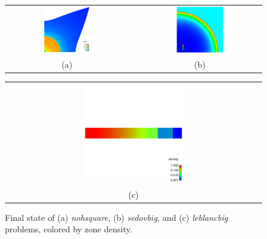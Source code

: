 \documentclass[11pt,letterpaper]{article}
\begin{document}
\begin{figure}
    \centering
    \begin{tabular}{ccc}
    \includegraphics[width=0.40\textwidth]{noh-result.png} &
    \hspace{0.06\textwidth} &
    \includegraphics[width=0.40\textwidth]{sedov-result.png} \\
    (a) && (b) \\
    \end{tabular}
    \begin{tabular}{c}
    \includegraphics[width=0.40\textwidth]{leblanc-result.png} \\
    (c) \\
    \end{tabular}
    \caption{Final state of (a) {\em nohsquare}, (b) {\em sedovbig},
    and (c) {\em leblancbig} problems, colored by zone density.}
    \label{fig:output}
\end{figure}
\end{document}
